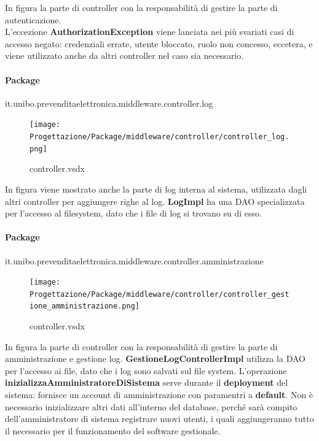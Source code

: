 \documentclass[a4paper]{article}
\begin{document}
In figura la parte di controller con la responsabilità di gestire la parte di autenticazione.\\L'eccezione \textbf{AuthorizationException} viene lanciata nei più svariati casi di accesso negato: credenziali errate, utente bloccato, ruolo non concesso, eccetera, e viene utilizzato anche da altri controller nel caso sia necessario.

\newpage

\paragraph{Package} it.unibo.prevenditaelettronica.middleware.controller.log


\begin{figure}[H]
    \texttt{[image: Progettazione/Package/middleware/controller/controller\_log.png]}
    \centering
    \caption{controller.vsdx}
\end{figure}

In figura viene mostrato anche la parte di log interna al sistema, utilizzata dagli altri controller per aggiungere righe al log. \textbf{LogImpl} ha una DAO specializzata per l'accesso al filesystem, dato che i file di log si trovano su di esso.

\paragraph{Package} it.unibo.prevenditaelettronica.middleware.controller.amministrazione


\begin{figure}[H]
    \texttt{[image: Progettazione/Package/middleware/controller/controller\_gestione\_amministrazione.png]}
    \centering
    \caption{controller.vsdx}
\end{figure}

In figura la parte di controller con la responsabilità di gestire la parte di amministrazione e gestione log. \textbf{GestioneLogControllerImpl} utilizza la DAO per l'accesso ai file, dato che i log sono salvati sul file system. L'operazione \textbf{inizializzaAmministratoreDiSistema} serve durante il \textbf{deployment} del sistema: fornisce un account di amministrazione con paramentri a \textbf{default}. Non è necessario inizializzare altri dati all'interno del database, perché sarà compito dell'amministratore di sistema registrare nuovi utenti, i quali aggiungeranno tutto il necessario per il funzionamento del software gestionale.
\end{document}

